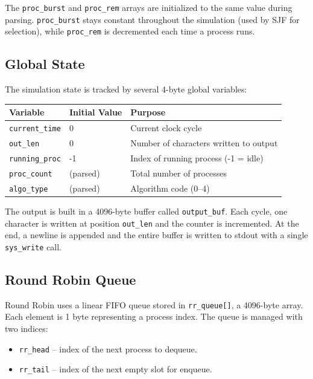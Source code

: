 \documentclass[a4paper,12pt]{article}
\begin{document}
The \texttt{proc\_burst} and \texttt{proc\_rem} arrays are initialized to the same value during parsing. \texttt{proc\_burst} stays constant throughout the simulation (used by SJF for selection), while \texttt{proc\_rem} is decremented each time a process runs.

\subsection{Global State}

The simulation state is tracked by several 4-byte global variables:

\begin{center}
\begin{tabular}{|l|l|l|}
\hline
\textbf{Variable} & \textbf{Initial Value} & \textbf{Purpose} \\
\hline
\texttt{current\_time} & 0 & Current clock cycle \\
\texttt{out\_len} & 0 & Number of characters written to output \\
\texttt{running\_proc} & -1 & Index of running process (-1 = idle) \\
\texttt{proc\_count} & (parsed) & Total number of processes \\
\texttt{algo\_type} & (parsed) & Algorithm code (0--4) \\
\hline
\end{tabular}
\end{center}

The output is built in a 4096-byte buffer called \texttt{output\_buf}. Each cycle, one character is written at position \texttt{out\_len} and the counter is incremented. At the end, a newline is appended and the entire buffer is written to stdout with a single \texttt{sys\_write} call.

\subsection{Round Robin Queue}

Round Robin uses a linear FIFO queue stored in \texttt{rr\_queue[]}, a 4096-byte array. Each element is 1 byte representing a process index. The queue is managed with two indices:

\begin{itemize}
    \item \texttt{rr\_head} -- index of the next process to dequeue.
    \item \texttt{rr\_tail} -- index of the next empty slot for enqueue.
\end{itemize}
\end{document}
